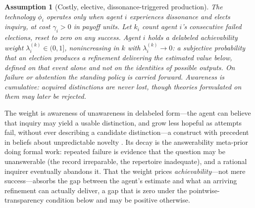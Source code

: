 \documentclass[11pt]{article}
\newtheorem{assumption}{Assumption}[section]
\theoremstyle{definition}
\begin{document}
\begin{assumption}[Costly, elective, dissonance-triggered production]
\label{ass:elective}
The technology $\phi_i$ operates only when agent $i$ experiences dissonance and elects inquiry, at cost $\gamma_i>0$ in payoff units.
Let $k_i$ count agent $i$'s consecutive failed elections, reset to zero on any success.
Agent $i$ holds a \emph{delabeled achievability weight} $\lambda_i^{(k)}\in(0,1]$, nonincreasing in $k$ with $\lambda_i^{(k)}\to0$: a subjective probability that an election produces a refinement \emph{delivering the estimated value below}, defined on that event alone and not on the identities of possible outputs.
On failure or abstention the standing policy is carried forward.
Awareness is cumulative: acquired distinctions are never lost, though theories formulated on them may later be rejected.
\end{assumption}

The weight is awareness of unawareness in delabeled form---the agent can believe that inquiry may yield a usable distinction, and grow less hopeful as attempts fail, without ever describing a candidate distinction---a construct with precedent in beliefs about unpredictable novelty \citep{Schipper2025,KarniViero2017}.
Its decay is the answerability meta-prior doing formal work: repeated failure is evidence that the question may be unanswerable (the record irreparable, the repertoire inadequate), and a rational inquirer eventually abandons it.
That the weight prices \emph{achievability}---not mere success---absorbs the gap between the agent's estimate and what an arriving refinement can actually deliver, a gap that is zero under the pointwise-transparency condition below and may be positive otherwise.
\end{document}
